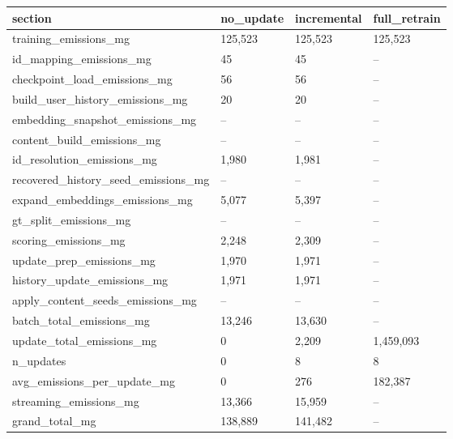 \begin{tabular}{llll}
\toprule
section & no_update & incremental & full_retrain \\
\midrule
training_emissions_mg & 125,523 & 125,523 & 125,523 \\
id_mapping_emissions_mg & 45 & 45 & -- \\
checkpoint_load_emissions_mg & 56 & 56 & -- \\
build_user_history_emissions_mg & 20 & 20 & -- \\
embedding_snapshot_emissions_mg & -- & -- & -- \\
content_build_emissions_mg & -- & -- & -- \\
id_resolution_emissions_mg & 1,980 & 1,981 & -- \\
recovered_history_seed_emissions_mg & -- & -- & -- \\
expand_embeddings_emissions_mg & 5,077 & 5,397 & -- \\
gt_split_emissions_mg & -- & -- & -- \\
scoring_emissions_mg & 2,248 & 2,309 & -- \\
update_prep_emissions_mg & 1,970 & 1,971 & -- \\
history_update_emissions_mg & 1,971 & 1,971 & -- \\
apply_content_seeds_emissions_mg & -- & -- & -- \\
batch_total_emissions_mg & 13,246 & 13,630 & -- \\
update_total_emissions_mg & 0 & 2,209 & 1,459,093 \\
n_updates & 0 & 8 & 8 \\
avg_emissions_per_update_mg & 0 & 276 & 182,387 \\
streaming_emissions_mg & 13,366 & 15,959 & -- \\
grand_total_mg & 138,889 & 141,482 & -- \\
\bottomrule
\end{tabular}
